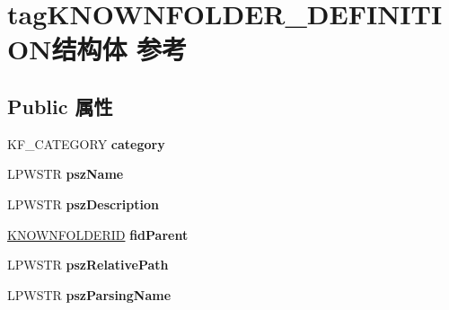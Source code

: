 \hypertarget{structtag_k_n_o_w_n_f_o_l_d_e_r___d_e_f_i_n_i_t_i_o_n}{}\section{tag\+K\+N\+O\+W\+N\+F\+O\+L\+D\+E\+R\+\_\+\+D\+E\+F\+I\+N\+I\+T\+I\+O\+N结构体 参考}
\label{structtag_k_n_o_w_n_f_o_l_d_e_r___d_e_f_i_n_i_t_i_o_n}
\subsection*{Public 属性}
\begin{DoxyCompactItemize}
\item 
\mbox{\label{structtag_k_n_o_w_n_f_o_l_d_e_r___d_e_f_i_n_i_t_i_o_n_abde2701a664db177d89dc256f143da59}} 
K\+F\+\_\+\+C\+A\+T\+E\+G\+O\+RY {\bfseries category}
\item 
\mbox{\label{structtag_k_n_o_w_n_f_o_l_d_e_r___d_e_f_i_n_i_t_i_o_n_a6862a8ce44e92f7247edb14797f11a9b}} 
L\+P\+W\+S\+TR {\bfseries psz\+Name}
\item 
\mbox{\label{structtag_k_n_o_w_n_f_o_l_d_e_r___d_e_f_i_n_i_t_i_o_n_a28c277da36c6bbb5411c2ac63a303220}} 
L\+P\+W\+S\+TR {\bfseries psz\+Description}
\item 
\mbox{\label{structtag_k_n_o_w_n_f_o_l_d_e_r___d_e_f_i_n_i_t_i_o_n_a48eef75c0cb1c362650b2b1e02c93e17}} 
\hyperlink{interface_g_u_i_d}{K\+N\+O\+W\+N\+F\+O\+L\+D\+E\+R\+ID} {\bfseries fid\+Parent}
\item 
\mbox{\label{structtag_k_n_o_w_n_f_o_l_d_e_r___d_e_f_i_n_i_t_i_o_n_adf9a7a61fc8e290f6bc09abd3b89b6c3}} 
L\+P\+W\+S\+TR {\bfseries psz\+Relative\+Path}
\item 
\mbox{\label{structtag_k_n_o_w_n_f_o_l_d_e_r___d_e_f_i_n_i_t_i_o_n_a737bcdb123ca506a1b4e52881c4360ce}} 
L\+P\+W\+S\+TR {\bfseries psz\+Parsing\+Name}

\end{DoxyCompactItemize}
